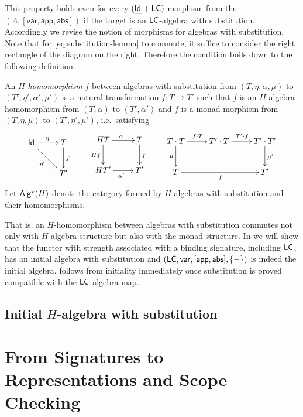 \documentclass[acmsmall,review]{acmart}\settopmatter{printfolios=true,printccs=false,printacmref=false}
\theoremstyle{acmdefinition}
\begin{document}
This property holds even for every $(\underline{\mathsf{Id}_{}}+\mathsf{LC})$-morphism from the $(\Lambda, [\mathsf{var}, \mathsf{app}, \mathsf{abs}])$ if the target is an $\mathsf{LC}$-algebra with substitution.
Accordingly we revise the notion of morphisms for algebras with substitution.
Note that for \eqref{eq:substitution-lemma} to commute, it suffice to consider the right rectangle of the diagram on the right. 
Therefore the condition boils down to the following definition.
\begin{definition}
An \emph{$H$-homomorphism} $f$ between algebras with substitution from $(T, \eta, \alpha, \mu)$ to $(T', \eta', \alpha', \mu')$ is a natural transformation $f\colon T \to T'$ such that $f$ is an $H$-algebra homomorphism from $(T, \alpha)$ to $(T', \alpha')$ and $f$ is a monad morphism from $(T, \eta, \mu)$ to $(T', \eta', \mu')$, i.e.\ satisfying
\[
  \vcenter{
    \xymatrix{
      \Id \ar[r]^{\eta} \ar[rd]_{\eta'} & T \ar[d]^{f} \\
        & T'
    }
  }
  \qquad
  \vcenter{
    \xymatrix{
      HT  \ar[d]_{Hf} \ar[r]^{\alpha} & T \ar[d]^{f} \\
      HT' \ar[r]_{\alpha'} & T'
    }
  }
  \qquad
  \vcenter{
    \xymatrix{
      T \fcomp T \ar[d]_{\mu} \ar[r]^{f \fcomp T} & T' \fcomp T \ar[r]^{T' \fcomp f} & T' \fcomp T' \ar[d]^{\mu'} \\
      T \ar[rr]_{f} & & T'
    }
  }
\]
Let $\mathsf{Alg^\star}({H})$ denote the category formed by $H$-algebras with substitution and their homomorphisms.
\end{definition}
That is, an $H$-homomorphism between algebras with substitution commutes not only with $H$-algebra structure but also with the monad structure.
In  we will show that the functor with strength associated with a binding signature, including $\mathsf{LC}$, has an initial algebra with substitution and $(\mathsf{LC}, \mathsf{var}, [\mathsf{app}, \mathsf{abs}], \left\{{{-}}\right\})$ is indeed the initial algebra.
 follows from initiality immediately once substitution is proved compatible with the $\mathsf{LC}$-algebra map.


\subsection{Initial \texorpdfstring{$H$}{H}-algebra with substitution}

\section{From Signatures to Representations and Scope Checking}
\end{document}
